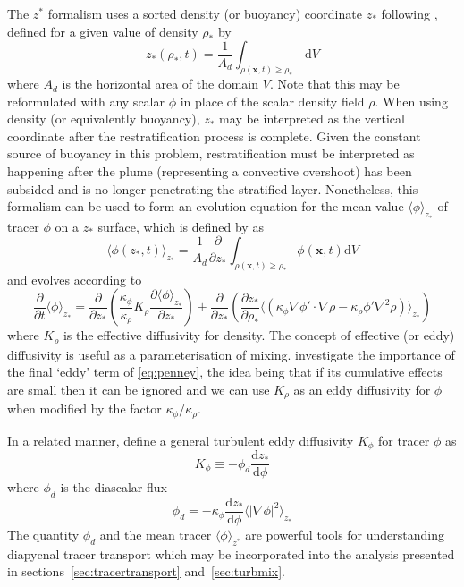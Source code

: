 \documentclass[a4paper]{article}
\begin{document}
The $z^*$ formalism uses a sorted density (or buoyancy) coordinate $z_*$ following \citet{winters1996},
defined for a given value of density $\rho_*$ by
\begin{equation}
	z_*(\rho_*, t) = \frac{1}{A_d}\int_{\rho(\bm{x},t) \ge \rho_*} \, \mathrm{d}V
\end{equation}
where $A_d$ is the horizontal area of the domain $V$. Note that this may be reformulated with any scalar $\phi$
in place of the scalar density field $\rho$. When using density (or equivalently buoyancy), $z_*$ may be
interpreted as the vertical coordinate after the restratification process is complete. Given the constant
source of buoyancy in this problem, restratification must be interpreted as happening after the plume
(representing a convective overshoot) has been subsided and is no longer penetrating the stratified layer.
Nonetheless, this formalism can be used to form an evolution equation for the mean value $\langle \phi
\rangle_{z_*}$ of tracer $\phi$ on a $z_*$ surface, which is defined by \citet{penney2020} as
\begin{equation}
	\langle \phi(z_*, t) \rangle_{z_*} = \frac{1}{A_d} \frac{\partial}{\partial z_*} \int_{\rho(\bm{x}, t) \ge
		\rho_*} \phi(\bm{x}, t) \mathrm{d}V
\end{equation}
and evolves according to
\begin{equation}
	\frac{\partial}{\partial t} \langle \phi\rangle_{z_*} = \frac{\partial}{\partial z_*} \left(
	\frac{\kappa_\phi}{\kappa_\rho}K_\rho \frac{\partial \langle \phi \rangle_{z_*}}{\partial z_*} \right)
	+ \frac{\partial}{\partial z_*}\left(\frac{\partial z_*}{\partial \rho_*} \langle (\kappa_\phi \nabla
	\phi' \cdot \nabla \rho - \kappa_\rho \phi' \nabla^2 \rho)\rangle_{z_*}\right)
	\label{eq:penney}
\end{equation}
where $K_\rho$ is the effective diffusivity for density. The concept of effective (or eddy) diffusivity is
useful as a parameterisation of mixing. \citet{penney2020} investigate the importance of the final `eddy' term
of \eqref{eq:penney}, the idea being that if its cumulative effects are small then it can be ignored and we
can use $K_\rho$ as an eddy diffusivity for $\phi$ when modified by the factor $\kappa_\phi/\kappa_\rho$.

In a related manner, \citet{winters1996} define a general turbulent eddy diffusivity $K_\phi$ for tracer
$\phi$ as
\begin{equation}
	K_\phi \equiv -\phi_d \frac{\mathrm{d}z_*}{\mathrm{d}\phi}
	\label{eq:kphi}
\end{equation}
where $\phi_d$ is the diascalar flux
\begin{equation}
	\phi_d = -\kappa_\phi \frac{\mathrm{d}z_*}{\mathrm{d}\phi} \langle \left| \nabla \phi \right|^2
	\rangle_{z_*}
\end{equation}
The quantity $\phi_d$ and the mean tracer $\langle \phi \rangle_{z^*}$ are powerful tools for understanding
diapycnal tracer transport which may be incorporated into the analysis presented in
sections~\ref{sec:tracertransport} and~\ref{sec:turbmix}.
\end{document}
